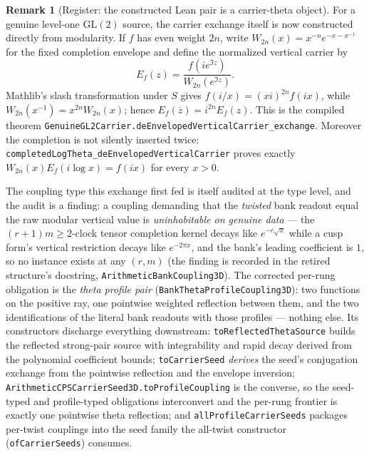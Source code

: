 \documentclass[11pt]{article}
\theoremstyle{definition}
\newtheorem{remark}[theorem]{Remark}
\begin{document}
\begin{remark}[Register: the constructed Lean pair is a carrier-theta object]
For a genuine level-one GL$(2)$ source, the carrier exchange itself is now constructed directly
from modularity.  If $f$ has even weight $2n$, write
$W_{2n}(x)=x^{-n}e^{-x-x^{-1}}$ for the fixed completion envelope and define the normalized
vertical carrier by
\[
 E_f(z)=\frac{f\!\left(i e^{\Im z}\right)}
 {W_{2n}\!\left(e^{\Im z}\right)}.
\]
Mathlib's slash transformation under $S$ gives
$f(i/x)=(xi)^{2n}f(ix)$, while
$W_{2n}(x^{-1})=x^{2n}W_{2n}(x)$; hence
$E_f(\overline z)=i^{2n}E_f(z)$.  This is the compiled theorem
\texttt{GenuineGL2Carrier.deEnvelopedVerticalCarrier\_exchange}.  Moreover the completion is
not silently inserted twice:
\texttt{completedLogTheta\_deEnvelopedVerticalCarrier} proves exactly
$W_{2n}(x)E_f(i\log x)=f(ix)$ for every $x>0$.

The coupling type this exchange first fed is itself audited at the type level, and the audit is
a finding: a coupling demanding that the \emph{twisted} bank readout equal the raw modular
vertical value is \emph{uninhabitable on genuine data} --- the $(r{+}1)m\ge2$-clock tensor
completion kernel decays like $e^{-c\sqrt x}$ while a cusp form's vertical restriction decays
like $e^{-2\pi x}$, and the bank's leading coefficient is $1$, so no instance exists at any
$(r,m)$ (the finding is recorded in the retired structure's docstring,
\texttt{ArithmeticBankCoupling3D}).  The corrected per-rung obligation is the \emph{theta
profile pair} (\texttt{BankThetaProfileCoupling3D}): two functions on the positive ray, one
pointwise weighted reflection between them, and the two identifications of the literal bank
readouts with those profiles --- nothing else.  Its constructors discharge everything
downstream: \texttt{toReflectedThetaSource} builds the reflected strong-pair source with
integrability and rapid decay derived from the polynomial coefficient bounds;
\texttt{toCarrierSeed} \emph{derives} the seed's conjugation exchange from the pointwise
reflection and the envelope inversion; \texttt{ArithmeticCPSCarrierSeed3D.toProfileCoupling} is
the converse, so the seed-typed and profile-typed obligations interconvert and the per-rung
frontier is exactly one pointwise theta reflection; and \texttt{allProfileCarrierSeeds} packages
per-twist couplings into the seed family the all-twist constructor
(\texttt{ofCarrierSeeds}) consumes.


\end{remark}
\end{document}
